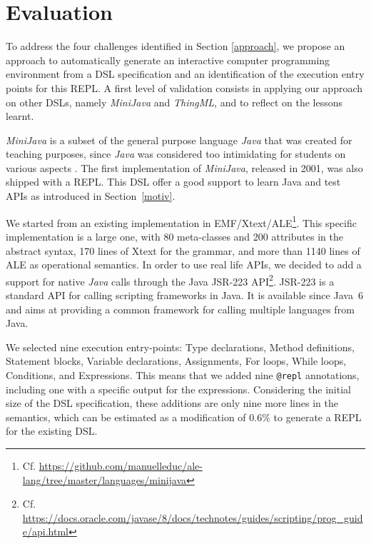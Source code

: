 \section{Evaluation}
\label{sec:evaluation}

To address the four challenges identified in Section \ref{approach}, we propose an approach to automatically generate an interactive computer programming environment from a DSL specification and an identification of the execution entry points for this REPL. A first level of validation consists in applying our approach on other DSLs, namely \textit{MiniJava} and \textit{ThingML}, and to reflect on the lessons learnt. 
   


\textit{MiniJava} is a subset of the general purpose language \textit{Java} that was created for teaching purposes, since \textit{Java} was considered too intimidating for students on various aspects \cite{Roberts:2001:OM:364447.364525}. The first implementation of \textit{MiniJava}, released in 2001, was also shipped with a REPL.  This DSL offer a good support to learn Java and test APIs as introduced in Section~\ref{motiv}.

We started from an existing implementation in EMF/Xtext/ALE\footnote{Cf. \url{https://github.com/manuelleduc/ale-lang/tree/master/languages/minijava}}.
This specific implementation is a large one, with 80 meta-classes and 200 attributes in the abstract syntax, 170 lines of Xtext for the grammar, and more than 1140 lines of ALE as operational semantics.
In order to use real life APIs, we decided to add a support for native \textit{Java} calls through the Java JSR-223 API\footnote{Cf. \url{https://docs.oracle.com/javase/8/docs/technotes/guides/scripting/prog\_guide/api.html}}. 	JSR-223 is a standard API for calling scripting frameworks in Java. It is available since Java~6 and aims at providing a common framework for calling multiple languages from Java. 

We selected nine execution entry-points: Type declarations, Method definitions, Statement blocks, Variable declarations, Assignments, For loops, While loops, Conditions, and Expressions. This means that we added nine \verb|@repl| annotations, including one with a specific output for the expressions. Considering the initial size of the DSL specification, these additions are only nine more lines in the semantics, which can be estimated as a modification of $0.6\%$ to generate a REPL for the existing DSL.

